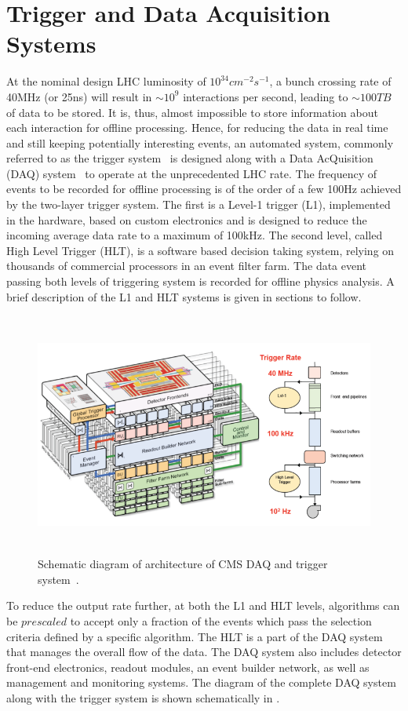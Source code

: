 \section{Trigger and Data Acquisition Systems}\label{Se:triDas}
At the nominal design LHC luminosity of $10^{34}\unit{cm^{-2}s^{-1}}$, a bunch crossing rate of 40\unit{MHz} (or 25\unit{ns}) will result in 
$\sim10^{9}$ interactions per second, leading to $\sim100\unit{TB}$ of data to be stored. It is, thus, almost impossible to store information about 
each interaction for offline processing. Hence, for reducing the data in real time and still keeping potentially interesting events, an 
automated system, commonly referred to as the  trigger system~\cite{triggerTDR} is designed along with a Data AcQuisition (\gls{DAQ}) system~\cite{daqhltTDR}
to operate at the unprecedented LHC rate. The frequency of events to be recorded for offline processing is of the order of a few 100\unit{Hz}
achieved by the two-layer trigger system. The first is a Level-1 trigger (L1), implemented in the hardware, based on custom electronics and is
 designed to reduce the incoming average data rate to a maximum of 100\unit{kHz}. The second level, called High Level Trigger (\gls{HLT}), is a software 
based decision taking system, relying on thousands of commercial processors in an event filter farm. The data event passing both levels of
triggering system is recorded for offline physics analysis. A brief description of the L1 and HLT systems is given in sections to follow. 
\begin{figure}[h]
\centering
\includegraphics[width=15cm,height=8cm]{ch2/figures/DAQsystem.png}
\caption{Schematic diagram of architecture of CMS DAQ and trigger system~\cite{Web:CERNcds}.}
\label{fig:DAQsystem}
\end{figure}
To reduce the output rate further, at both the L1 and HLT levels, algorithms can be $prescaled$ to accept only a fraction  of the events which pass the 
selection criteria defined by a specific algorithm. The HLT is a part of the DAQ system that manages the overall flow of the data. The DAQ system also 
includes detector front-end electronics, readout modules, an event builder network, as well as management and monitoring systems. The diagram of the 
complete DAQ system along with the trigger system is shown schematically in \fig{\ref{fig:DAQsystem}}.

